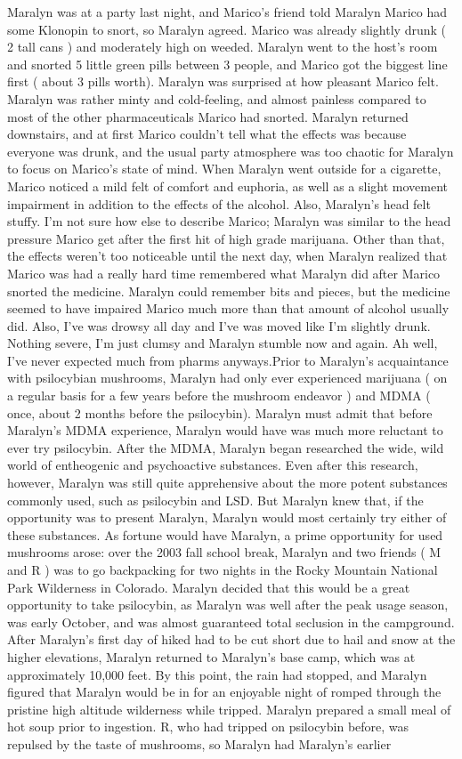 \documentclass[12pt]{book}
\begin{document}
Maralyn was at a party last night, and Marico's friend told Maralyn Marico had some Klonopin to snort, so Maralyn agreed. Marico was already slightly drunk ( 2 tall cans ) and moderately high on weeded. Maralyn went to the host's room and snorted 5 little green pills between 3 people, and Marico got the biggest line first ( about 3 pills worth). Maralyn was surprised at how pleasant Marico felt. Maralyn was rather minty and cold-feeling, and almost painless compared to most of the other pharmaceuticals Marico had snorted. Maralyn returned downstairs, and at first Marico couldn't tell what the effects was because everyone was drunk, and the usual party atmosphere was too chaotic for Maralyn to focus on Marico's state of mind. When Maralyn went outside for a cigarette, Marico noticed a mild felt of comfort and euphoria, as well as a slight movement impairment in addition to the effects of the alcohol. Also, Maralyn's head felt stuffy. I'm not sure how else to describe Marico; Maralyn was similar to the head pressure Marico get after the first hit of high grade marijuana. Other than that, the effects weren't too noticeable until the next day, when Maralyn realized that Marico was had a really hard time remembered what Maralyn did after Marico snorted the medicine. Maralyn could remember bits and pieces, but the medicine seemed to have impaired Marico much more than that amount of alcohol usually did. Also, I've was drowsy all day and I've was moved like I'm slightly drunk. Nothing severe, I'm just clumsy and Maralyn stumble now and again. Ah well, I've never expected much from pharms anyways.Prior to Maralyn's acquaintance with psilocybian mushrooms, Maralyn had only ever experienced marijuana ( on a regular basis for a few years before the mushroom endeavor ) and MDMA ( once, about 2 months before the psilocybin). Maralyn must admit that before Maralyn's MDMA experience, Maralyn would have was much more reluctant to ever try psilocybin. After the MDMA, Maralyn began researched the wide, wild world of entheogenic and psychoactive substances. Even after this research, however, Maralyn was still quite apprehensive about the more potent substances commonly used, such as psilocybin and LSD. But Maralyn knew that, if the opportunity was to present Maralyn, Maralyn would most certainly try either of these substances. As fortune would have Maralyn, a prime opportunity for used mushrooms arose: over the 2003 fall school break, Maralyn and two friends ( M and R ) was to go backpacking for two nights in the Rocky Mountain National Park Wilderness in Colorado. Maralyn decided that this would be a great opportunity to take psilocybin, as Maralyn was well after the peak usage season, was early October, and was almost guaranteed total seclusion in the campground. After Maralyn's first day of hiked had to be cut short due to hail and snow at the higher elevations, Maralyn returned to Maralyn's base camp, which was at approximately 10,000 feet. By this point, the rain had stopped, and Maralyn figured that Maralyn would be in for an enjoyable night of romped through the pristine high altitude wilderness while tripped. Maralyn prepared a small meal of hot soup prior to ingestion. R, who had tripped on psilocybin before, was repulsed by the taste of mushrooms, so Maralyn had Maralyn's earlier 
\end{document}
